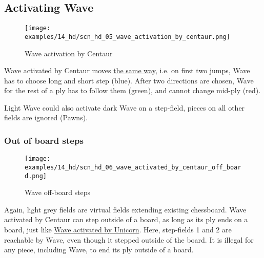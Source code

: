 \clearpage %

\subsection*{Activating Wave}

\vspace*{-1.0\baselineskip}
\noindent
\begin{figure}[!h]
\texttt{[image: examples/14\_hd/scn\_hd\_05\_wave\_activation\_by\_centaur.png]}
\caption{Wave activation by Centaur}
\label{fig:scn_hd_05_wave_activation_by_centaur}
\end{figure}

Wave activated by Centaur moves \hyperref[fig:scn_hd_03_centaur_multi_step]{the same way},
i.e. on first two jumps, Wave has to choose long and short step (blue). After two directions
are chosen, Wave for the rest of a ply has to follow them (green), and cannot change mid-ply
(red).

Light Wave could also activate dark Wave on a step-field, pieces on all other fields are
ignored (Pawns).

\clearpage %

\subsubsection*{Out of board steps}

\vspace*{-1.2\baselineskip}
\noindent
\begin{figure}[!h]
\texttt{[image: examples/14\_hd/scn\_hd\_06\_wave\_activated\_by\_centaur\_off\_board.png]}
\caption{Wave off-board steps}
\label{fig:scn_hd_06_wave_activated_by_centaur_off_board}
\end{figure}

Again, light grey fields are virtual fields extending existing chessboard.
Wave activated by Centaur can step outside of a board, as long as its ply
ends on a board, just like
\hyperref[fig:scn_mv_26_wave_off_board]{Wave activated by Unicorn}. Here,
step-fields 1 and 2 are reachable by Wave, even though it stepped outside
of the board. It is illegal for any piece, including Wave, to end its ply
outside of a board.

